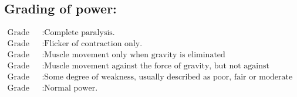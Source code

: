 \documentclass[a4paper,12pt,openany,oneside]{book}
\begin{document}
	\subsection*{Grading of power:}
	\par
	\begin{align*}
		\text{Grade 0} 	&:	\text{Complete paralysis.} \\
	\text{Grade 1} 	&: 	\text{Flicker of contraction only.}\\
		\text{Grade 2} 	&: \text{Muscle movement only when gravity is eliminated}\\
	\text{Grade 3} 	&:	\text{Muscle movement against the force of gravity, but not against resistance.} \\
	\text{Grade 4} 	&:	\text{Some degree of weakness, usually described as poor, fair or moderate 		strength.} \\
	\text{Grade 5} 	&:	\text{Normal power.}\\
	\end{align*}
\end{document}

